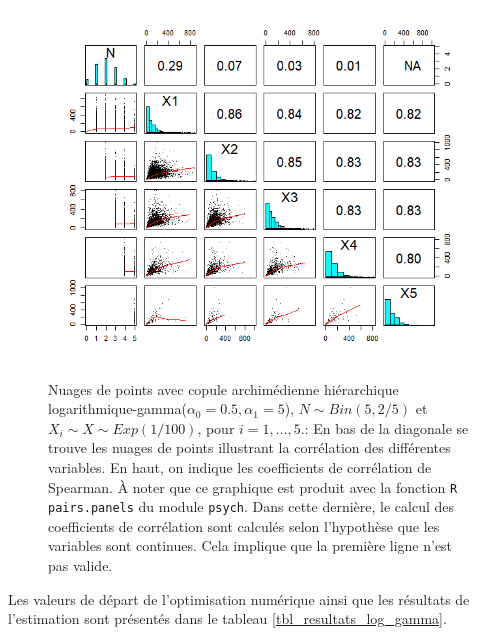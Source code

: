 \documentclass{article}
\begin{document}
		\begin{figure}[H]
			\centering
			\includegraphics[height=10cm]{Graph/scatterplot_log_gamma.png}
			\caption[Nuages de points du scénario \ref{scenario_log_gamma}]
			{Nuages de points avec copule archimédienne hiérarchique logarithmique-gamma($\alpha_0=0.5, \alpha_1 = 5$), $N \sim Bin(5, 2/5)$ et $X_i \sim X \sim Exp(1/100)$, pour $i=1,\dots, 5$.:
				En bas de la diagonale se trouve les nuages de points illustrant la corrélation des différentes variables. En haut, on indique les coefficients de corrélation de Spearman. À noter que ce graphique est produit avec la fonction \texttt{R} \texttt{pairs.panels} du module \texttt{psych}. Dans cette dernière, le calcul des coefficients de corrélation sont calculés selon l'hypothèse que les variables sont continues. Cela implique que la première ligne n'est pas valide.}
			\label{graph_scatterplot_log_gamma}
		\end{figure}

		Les valeurs de départ de l'optimisation numérique ainsi que les résultats de l'estimation sont présentés dans le tableau \ref{tbl_resultats_log_gamma}.
	
\end{document}

